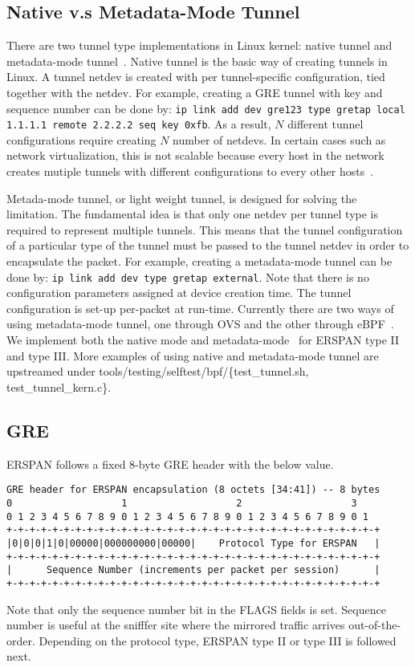 \documentclass{sigplanconf}
\begin{document}
\subsection{Native v.s Metadata-Mode Tunnel}
There are two tunnel type implementations in Linux kernel:
native tunnel and metadata-mode tunnel~\cite{lwtunnel}.
Native tunnel is the basic way of creating tunnels in Linux.
A tunnel netdev is created with per tunnel-specific configuration,
tied together with the netdev. For example, creating a GRE tunnel
with key and sequence number can be done by:
\texttt{ip link add dev gre123 type gretap local 1.1.1.1 remote 2.2.2.2 seq key 0xfb}.
As a result, $N$ different tunnel configurations require creating
$N$ number of netdevs.  In certain cases such as network virtualization,
this is not scalable because every host in the network creates
mutiple tunnels with different configurations to every other hosts~\cite{mvp}.

Metada-mode tunnel, or light weight tunnel, is designed for solving
the limitation.  The fundamental idea is that only one netdev per
tunnel type is required to represent multiple tunnels.
This means that the tunnel configuration of a particular type
of the tunnel must be passed to the tunnel netdev in order
to encapsulate the packet.  For example, creating a metadata-mode
tunnel can be done by:
\texttt{ip link add dev type gretap external}.
Note that there is no configuration parameters assigned at device creation
time. The tunnel configuration is set-up per-packet at run-time.
Currently there are two ways of using metadata-mode tunnel, one through
OVS and the other through eBPF~\cite{dborkman}.
We implement both the native mode and metadata-mode~\cite{erspanmd}
for ERSPAN type II and type III.
More examples of using native and metadata-mode tunnel are upstreamed
under tools/testing/selftest/bpf/\{test\_tunnel.sh, test\_tunnel\_kern.c\}.

\subsection{GRE}
ERSPAN follows a fixed 8-byte GRE header with the below value.
{\scriptsize
\begin{verbatim}
GRE header for ERSPAN encapsulation (8 octets [34:41]) -- 8 bytes
0                   1                   2                   3
0 1 2 3 4 5 6 7 8 9 0 1 2 3 4 5 6 7 8 9 0 1 2 3 4 5 6 7 8 9 0 1
+-+-+-+-+-+-+-+-+-+-+-+-+-+-+-+-+-+-+-+-+-+-+-+-+-+-+-+-+-+-+-+-+
|0|0|0|1|0|00000|000000000|00000|    Protocol Type for ERSPAN   |
+-+-+-+-+-+-+-+-+-+-+-+-+-+-+-+-+-+-+-+-+-+-+-+-+-+-+-+-+-+-+-+-+
|      Sequence Number (increments per packet per session)      |
+-+-+-+-+-+-+-+-+-+-+-+-+-+-+-+-+-+-+-+-+-+-+-+-+-+-+-+-+-+-+-+-+
\end{verbatim}
}
Note that only the sequence number bit in the FLAGS fields is set.
Sequence number is useful at the snifffer site where the mirrored
traffic arrives out-of-the-order.  Depending on the protocol type,
ERSPAN type II or type III is followed next.
\end{document}
